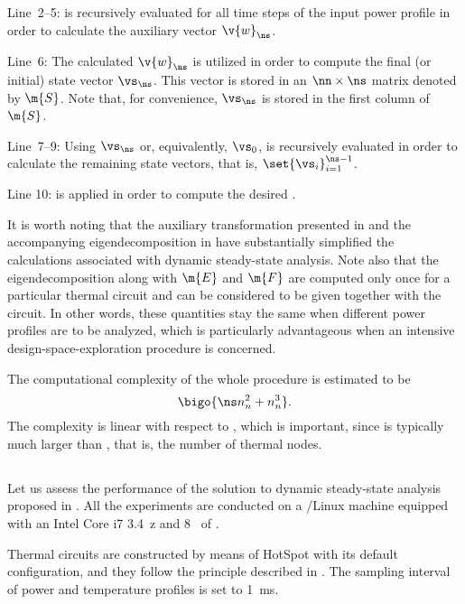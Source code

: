 Line~2--5:  is recursively evaluated
for all time steps of the input power profile \mp in order to calculate the
auxiliary vector $\v{w}_\ns$.

Line~6: The calculated $\v{w}_\ns$ is utilized in order to compute the final (or
initial) state vector $\vs_\ns$. This vector is stored in an $\nn \times \ns$
matrix denoted by $\m{S}$. Note that, for convenience, $\vs_\ns$ is stored in
the first column of $\m{S}$.

Line~7--9: Using $\vs_\ns$ or, equivalently, $\vs_0$,
 is recursively evaluated in order to calculate
the remaining state vectors, that is, $\set{\vs_i}_{i = 1}^{\ns - 1}$.

Line 10:  is applied in order to compute the desired
\mq.

It is worth noting that the auxiliary transformation presented in
 and the accompanying eigendecomposition in
 have substantially simplified the calculations
associated with dynamic steady-state analysis. Note also that the
eigendecomposition along with $\m{E}$ and $\m{F}$ are computed only once for a
particular thermal  circuit and can be considered to be given together
with the circuit. In other words, these quantities stay the same when different
power profiles are to be analyzed, which is particularly advantageous when an
intensive design-space-exploration procedure is concerned.

The computational complexity of the whole procedure is estimated to be
\[
  \bigo{\ns n_n^2 + n_n^3}.
\]
The complexity is linear with respect to \ns, which is important, since \ns is
typically much larger than \nn, that is, the number of thermal nodes.

\subsection{\resultstitle}

Let us assess the performance of the solution to dynamic steady-state analysis
proposed in . All the experiments are conducted on
a /Linux machine equipped with an Intel Core i7 3.4~z and
8~ of .

Thermal  circuits are constructed by means of HotSpot \cite{skadron2003}
with its default configuration, and they follow the principle described in
. The sampling interval \dt of power and temperature
profiles is set to 1~ms.

